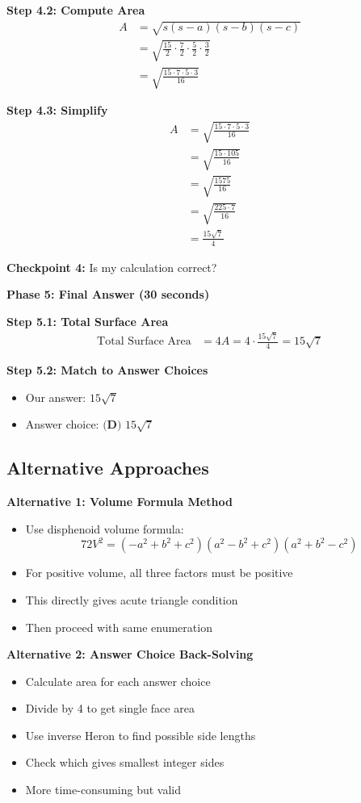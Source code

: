 \documentclass[12pt]{article}
\begin{document}
\begin{solutionbox}
\textbf{Step 4.2: Compute Area}
\begin{align*}
A &= \sqrt{s(s-a)(s-b)(s-c)} \\
&= \sqrt{\frac{15}{2} \cdot \frac{7}{2} \cdot \frac{5}{2} \cdot \frac{3}{2}} \\
&= \sqrt{\frac{15 \cdot 7 \cdot 5 \cdot 3}{16}}
\end{align*}

\textbf{Step 4.3: Simplify}
\begin{align*}
A &= \sqrt{\frac{15 \cdot 7 \cdot 5 \cdot 3}{16}} \\
&= \sqrt{\frac{15 \cdot 105}{16}} \\
&= \sqrt{\frac{1575}{16}} \\
&= \sqrt{\frac{225 \cdot 7}{16}} \\
&= \frac{15\sqrt{7}}{4}
\end{align*}

\textbf{Checkpoint 4:} Is my calculation correct?

\textbf{Phase 5: Final Answer (30 seconds)}

\textbf{Step 5.1: Total Surface Area}
\begin{align*}
\text{Total Surface Area} &= 4A = 4 \cdot \frac{15\sqrt{7}}{4} = 15\sqrt{7}
\end{align*}

\textbf{Step 5.2: Match to Answer Choices}
\begin{itemize}
    \item Our answer: $15\sqrt{7}$
    \item Answer choice: $\textbf{(D) } 15\sqrt{7}$
\end{itemize}

\subsection*{Alternative Approaches}

\textbf{Alternative 1: Volume Formula Method}
\begin{itemize}
    \item Use disphenoid volume formula:
    \[72V^2 = (-a^2+b^2+c^2)(a^2-b^2+c^2)(a^2+b^2-c^2)\]
    \item For positive volume, all three factors must be positive
    \item This directly gives acute triangle condition
    \item Then proceed with same enumeration
\end{itemize}

\textbf{Alternative 2: Answer Choice Back-Solving}
\begin{itemize}
    \item Calculate area for each answer choice
    \item Divide by 4 to get single face area
    \item Use inverse Heron to find possible side lengths
    \item Check which gives smallest integer sides
    \item More time-consuming but valid
\end{itemize}


\end{solutionbox}
\end{document}
